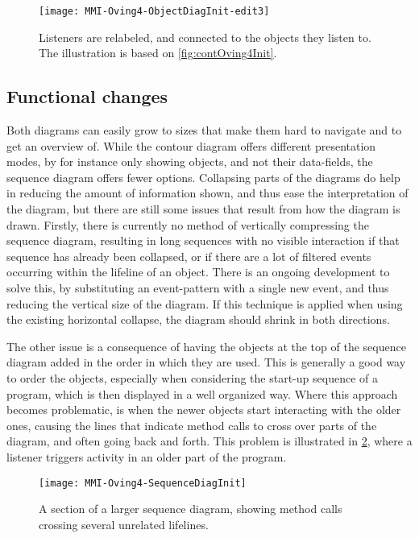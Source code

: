 \begin{figure}[H]
	\centering
	\texttt{[image: MMI-Oving4-ObjectDiagInit-edit3]}
	\caption{Listeners are relabeled, and connected to the objects they listen to. The illustration is based on \cref{fig:contOving4Init}.}
	\label{fig:contOving4ChangesLink}
\end{figure}


\subsection{Functional changes}\label{jiveSuggestionsFunctional}
Both diagrams can easily grow to sizes that make them hard to navigate and to get an overview of.
While the contour diagram offers different presentation modes, by for instance only showing objects, and not their data-fields, the sequence diagram offers fewer options.
Collapsing parts of the diagrams do help in reducing the amount of information shown, and thus ease the interpretation of the diagram, but there are still some issues that result from how the diagram is drawn.
Firstly, there is currently no method of vertically compressing the sequence diagram, resulting in long sequences with no visible interaction if that sequence has already been collapsed, or if there are a lot of filtered events occurring within the lifeline of an object.
There is an ongoing development to solve this, by substituting an event-pattern with a single new event, and thus reducing the vertical size of the diagram.
If this technique is applied when using the existing horizontal collapse, the diagram should shrink in both directions.


The other issue is a consequence of having the objects at the top of the sequence diagram added in the order in which they are used.
This is generally a good way to order the objects, especially when considering the start-up sequence of a program, which is then displayed in a well organized way.
Where this approach becomes problematic, is when the newer objects start interacting with the older ones, causing the lines that indicate method calls to cross over parts of the diagram, and often going back and forth.
This problem is illustrated in \cref{fig:seqOving4CrossLines}, where a listener triggers activity in an older part of the program.

\begin{figure}[H]
	\centering
	\texttt{[image: MMI-Oving4-SequenceDiagInit]}
	\caption{A section of a larger sequence diagram, showing method calls crossing several unrelated lifelines.}
	\label{fig:seqOving4CrossLines}
\end{figure}


